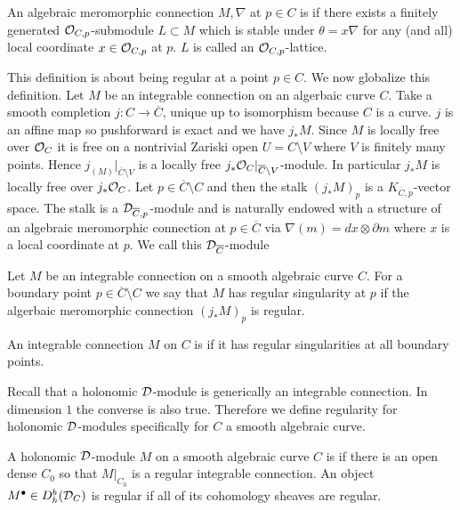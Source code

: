 \begin{definition}
	An algebraic meromorphic connection $M,\nabla$ at $p\in C$ is  if
	there exists a finitely generated ${\mathcal{O}}_{C,p}$-submodule $L\subset M$ which is stable
	under $\theta = x\nabla$ for any (and all) local coordinate $x \in {\mathcal{O}}_{C,p}$ at $p$.
	$L$ is called an ${\mathcal{O}}_{C,p}$-lattice.
\end{definition}
This definition is about being regular at a point $p\in C$. We now globalize this definition.
Let $M$ be an integrable connection on an algerbaic curve $C$. Take
a smooth completion $j:C\to \overline C$, unique up to isomorphism because
$C$ is a curve. $j$ is an affine map so pushforward is exact and we have $j_*M$.
Since $M$ is locally free over ${\mathcal{O}}_C$ it is free on a nontrivial Zariski open $U = C\setminus V$
where $V$ is finitely many points.
Hence $j_(M)\vert_{\overline C \setminus V}$ is a locally free $j_*{\mathcal{O}}_C\vert_{\overline C\setminus V}$-module.
In particular $j_*M$ is locally free over $j_*{\mathcal{O}}_C$. Let $p\in \overline C \setminus C$ and then
the stalk $(j_*M)_p$ is a $K_{\overline C,p}$-vector space. The stalk is a ${\mathcal{D}}_{\overline C,p}$-module
and is naturally endowed with a structure of an algebraic meromorphic connection at
$p\in \overline C$ via  $\nabla(m) = dx \otimes \partial m$ where $x$ is a local coordinate at $p$.
We call this ${\mathcal{D}}_{\overline C}$-module 
\begin{definition}
	Let $M$ be an integrable connection on a smooth algebraic curve $C$.
	For a boundary point $p\in \overline{C} \setminus C$ we say that $M$ has
	regular singularity at $p$ if the algerbaic meromorphic connection $(j_*M)_p$ is regular.

	\hfill

	An integrable connection $M$ on $C$ is  if it has regular singularities at all boundary points.
\end{definition}

Recall that a holonomic ${\mathcal{D}}$-module is generically an integrable connection. In dimension $1$
the converse is also true. Therefore we define regularity for holonomic ${\mathcal{D}}$-modules
specifically for $C$ a smooth algebraic curve.

\begin{definition}
	A holonomic ${\mathcal{D}}$-module $M$ on a smooth algebraic curve $C$ is  if
	there is an open dense $C_0$ so that $M\vert_{C_0}$ is a regular integrable connection.
	An object $M^\bullet \in D^b_h({\mathcal{D}}_C)$ is regular if all of its cohomology sheaves are regular.
\end{definition}

